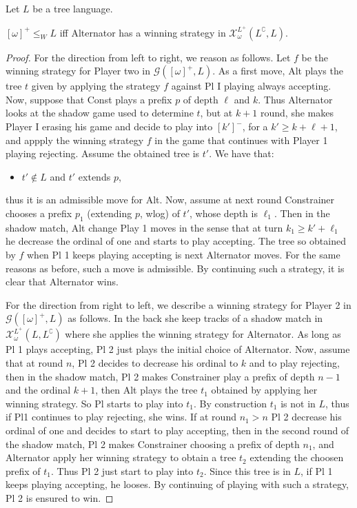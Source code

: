 \begin{proposition}\label{prop:omega} Let $L$ be a tree language.

$[\omega]^+ \leq_W L$ iff Alternator has a winning strategy in $\mathcal{X}^{L^+}_\omega(L^\complement, L)$. 

\end{proposition}
\begin{proof}
For the direction from left to right, we reason as follows. Let $f$ be the winning strategy for Player two in $\mathcal{G}([\omega]^+, L)$. As a first move, Alt plays the tree $t$ given by applying the strategy $f$ against Pl I playing always accepting. Now, suppose that Const plays a prefix $p$ of depth $\ell$ and $k$. Thus Alternator looks at the shadow game used to determine $t$, but at $k+1$ round, she makes Player I erasing his game and decide to play into $[k']^-$, for a $k' \geq k + \ell +1$, and appply the winning strategy $f$ in the game that continues with Player 1 playing rejecting. Assume the obtained tree is $t'$. We have that:
\begin{itemize}
\item $t' \notin L$ and $t'$ extends $p$,
\end{itemize}
thus it is an admissible move for Alt.
Now, assume at next round Constrainer chooses a prefix $p_1$ (extending $p$, wlog) of $t'$, whose depth is $\ell_1$. Then in the shadow match, Alt change Play 1 moves in the sense that at turn $k_1 \geq k' + \ell_1$ he decrease the ordinal of one and starts to play accepting. The tree so obtained by $f$ when Pl 1 keeps playing accepting is next Alternator moves. For the same reasons as before, such a move is admissible. By continuing such a strategy, it is clear that Alternator wins.

For the direction from right to left, we describe a winning strategy for Player 2 in $\mathcal{G}([\omega]^+, L)$ as follows. In the back she keep tracks of a shadow match in $\mathcal{X}^{L^+}_\omega(L, L^\complement)$ where she applies the  winning strategy for Alternator. 
As long as Pl 1 plays accepting, Pl 2 just plays the initial choice of Alternator. Now, assume that at round $n$, Pl 2 decides to decrease his ordinal to $k$ and to play rejecting, then in the shadow match, Pl 2 makes Constrainer play a prefix of depth $n-1$ and the ordinal $k+1$, then Alt plays the tree $t_1$ obtained by applying her winning strategy. So Pl starts to play into $t_1$. By construction $t_1$ is not in $L$, thus if Pl1 continues to play rejecting, she wins. If at round $n_1> n$ Pl 2 decrease his ordinal of one and decides to start to play accepting, then in the second round of the shadow match, Pl 2 makes Constrainer choosing a prefix of depth $n_1$, and Alternator apply her winning strategy to obtain a tree $t_2$ extending the choosen prefix of $t_1$. Thus Pl 2 just start to play into $t_2$. Since this tree is in $L$, if Pl 1 keeps playing accepting, he looses. By continuing of playing with such a strategy, Pl 2 is ensured to win. 
\end{proof}

